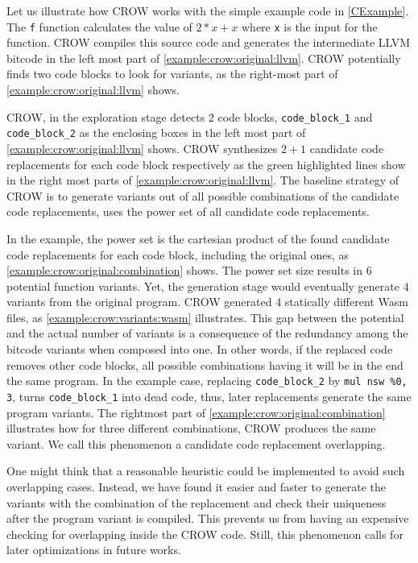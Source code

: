 Let us illustrate how CROW works with the simple example code in \autoref{CExample}. The \texttt{f} function calculates the value of $2 * x + x$ where \texttt{x} is the input for the function.  CROW compiles this source code and generates the intermediate LLVM bitcode in the left most part of \autoref{example:crow:original:llvm}. CROW potentially finds two code blocks to look for variants, as the right-most part of \autoref{example:crow:original:llvm} shows.


    

CROW, in the exploration stage detects 2 code blocks, \texttt{code\_block\_1} and \texttt{code\_block\_2} as the enclosing boxes in the left most part of \autoref{example:crow:original:llvm} shows. CROW synthesizes $2 + 1$ candidate code replacements for each code block respectively as the green highlighted lines show in the right most parts of \autoref{example:crow:original:llvm}.
The baseline strategy of CROW is to generate variants out of all possible combinations of the candidate code replacements, \ie uses the power set of all candidate code replacements.

In the example, the power set is the cartesian product of the found candidate code replacements for each code block, including the original ones, as \autoref{example:crow:original:combination} shows. The power set size results in $6$ potential function variants. Yet, the generation stage would eventually generate $4$ variants from the original program. CROW generated 4 statically different Wasm files, as \autoref{example:crow:variants:wasm} illustrates. This gap between the potential and the actual number of variants is a consequence of the redundancy among the bitcode variants when composed into one. In other words, if the replaced code removes other code blocks, all possible combinations having it will be in the end the same program. In the example case, replacing \texttt{code\_block\_2} by \texttt{mul nsw \%0, 3}, turns \texttt{code\_block\_1} into dead code, thus, later replacements generate the same program variants. The rightmost part of \autoref{example:crow:original:combination} illustrates how for three different combinations, CROW produces the same variant. We call this phenomenon a candidate code replacement overlapping.

One might think that a reasonable heuristic could be implemented to avoid such overlapping cases. Instead, we have found it easier and faster to generate the variants with the combination of the replacement and check their uniqueness after the program variant is compiled. This prevents us from having an expensive checking for overlapping inside the CROW code. Still, this phenomenon calls for later optimizations in future works.


